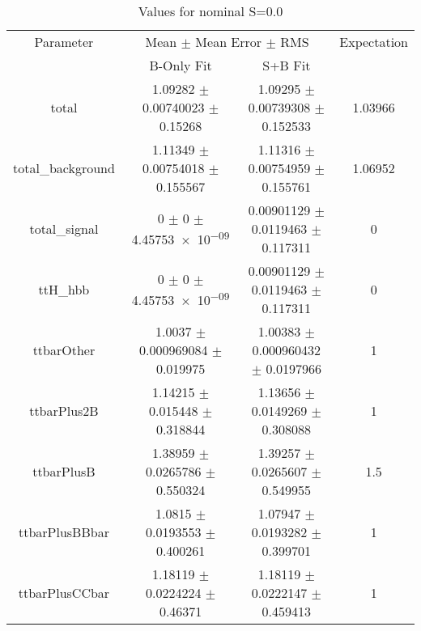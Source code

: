 \begin{table}
\centering
\caption{Values for nominal S=0.0}
\begin{tabular}{cccc}
\toprule
Parameter & \multicolumn{2}{c}{Mean $\pm$ Mean Error $\pm$ RMS} & Expectation\\
 & B-Only Fit & S+B Fit & \\
\midrule
total & \num{1.09282} $\pm$ \num{0.00740023} $\pm$ \num{0.15268} & \num{1.09295} $\pm$ \num{0.00739308} $\pm$ \num{0.152533} & \num{1.03966}\\
total\_background & \num{1.11349} $\pm$ \num{0.00754018} $\pm$ \num{0.155567} & \num{1.11316} $\pm$ \num{0.00754959} $\pm$ \num{0.155761} & \num{1.06952}\\
total\_signal & \num{0} $\pm$ \num{0} $\pm$ \num{4.45753e-09} & \num{0.00901129} $\pm$ \num{0.0119463} $\pm$ \num{0.117311} & \num{0}\\
ttH\_hbb & \num{0} $\pm$ \num{0} $\pm$ \num{4.45753e-09} & \num{0.00901129} $\pm$ \num{0.0119463} $\pm$ \num{0.117311} & \num{0}\\
ttbarOther & \num{1.0037} $\pm$ \num{0.000969084} $\pm$ \num{0.019975} & \num{1.00383} $\pm$ \num{0.000960432} $\pm$ \num{0.0197966} & \num{1}\\
ttbarPlus2B & \num{1.14215} $\pm$ \num{0.015448} $\pm$ \num{0.318844} & \num{1.13656} $\pm$ \num{0.0149269} $\pm$ \num{0.308088} & \num{1}\\
ttbarPlusB & \num{1.38959} $\pm$ \num{0.0265786} $\pm$ \num{0.550324} & \num{1.39257} $\pm$ \num{0.0265607} $\pm$ \num{0.549955} & \num{1.5}\\
ttbarPlusBBbar & \num{1.0815} $\pm$ \num{0.0193553} $\pm$ \num{0.400261} & \num{1.07947} $\pm$ \num{0.0193282} $\pm$ \num{0.399701} & \num{1}\\
ttbarPlusCCbar & \num{1.18119} $\pm$ \num{0.0224224} $\pm$ \num{0.46371} & \num{1.18119} $\pm$ \num{0.0222147} $\pm$ \num{0.459413} & \num{1}\\
\bottomrule
\end{tabular}
\end{table}